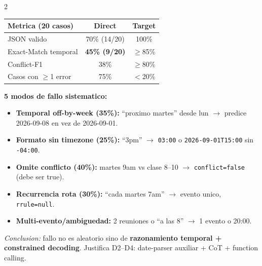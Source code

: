 \documentclass[a4paper,10pt]{article}
\begin{document}
\begin{multicols}{2}
\begin{tcolorbox}
\begin{center}
\renewcommand{\arraystretch}{1.15}
\begin{tabular}{lcc}
\toprule
\textbf{Metrica (20 casos)} & \textbf{Direct} & \textbf{Target} \\
\midrule
JSON valido & 70\% (14/20) & 100\% \\
Exact-Match temporal & \textbf{45\% (9/20)} & $\geq$85\% \\
Conflict-F1 & 38\% & $\geq$80\% \\
Casos con $\geq$1 error & 75\% & $<$20\% \\
\bottomrule
\end{tabular}
\end{center}

\textbf{5 modos de fallo sistematico:}
\begin{itemize}
\item \textbf{Temporal off-by-week (35\%):} ``proximo martes'' desde lun $\rightarrow$ predice 2026-09-08 en vez de 2026-09-01.
\item \textbf{Formato sin timezone (25\%):} ``3pm'' $\rightarrow$ \texttt{03:00} o \texttt{2026-09-01T15:00} sin \texttt{-04:00}.
\item \textbf{Omite conflicto (40\%):} martes 9am vs clase 8--10 $\rightarrow$ \texttt{conflict=false} (debe ser true).
\item \textbf{Recurrencia rota (30\%):} ``cada martes 7am'' $\rightarrow$ evento unico, \texttt{rrule=null}.
\item \textbf{Multi-evento/ambiguedad:} 2 reuniones o ``a las 8'' $\rightarrow$ 1 evento o 20:00.
\end{itemize}

\vspace{2pt}

\textit{Conclusion:} fallo no es aleatorio sino de \textbf{razonamiento temporal + constrained decoding}. Justifica D2--D4: date-parser auxiliar + CoT + function calling.
\end{tcolorbox}


\end{multicols}
\end{document}
